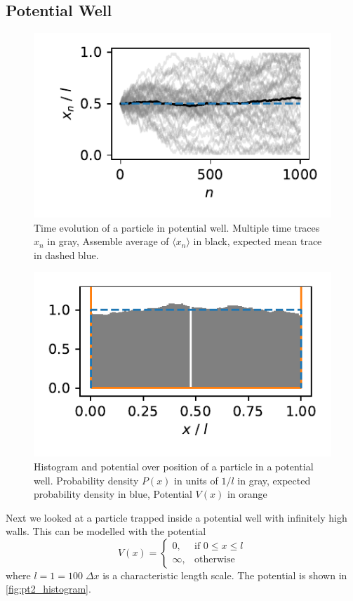 \documentclass[
    parskip=half, 
    twoside=false,
    twocolumn=true,
    fontsize=11pt,
]{scrarticle}
\begin{document}
\subsection{Potential Well}
\begin{figure}
    \centering
    \includegraphics{figures/02 time evolution.pdf}
    \caption{
        Time evolution of a particle in potential well.
        Multiple time traces $x_n$ in gray, Assemble average of $\langle x_n\rangle$ in black, expected mean trace in dashed blue.
    }
    \label{fig:pt2_trajectory}
\end{figure}
\begin{figure}
    \centering
    \includegraphics{figures/02 histogram.pdf}
    \caption{
        Histogram and potential over position of a particle in a potential well.
        Probability density $P(x)$ in units of $1/l$ in gray, expected probability density in blue, Potential $V(x)$ in orange
    }
    \label{fig:pt2_histogram}
\end{figure}

Next we looked at a particle trapped inside a potential well with infinitely high walls.
This can be modelled with the potential
$$
V(x) = \begin{cases}
    0, &\text{if } 0\leq x\leq l\\
    \infty, &\text{otherwise}
\end{cases}
$$
where $l=1=100\;\Delta x$ is a characteristic length scale.
The potential is shown in \autoref{fig:pt2_histogram}.
\end{document}
